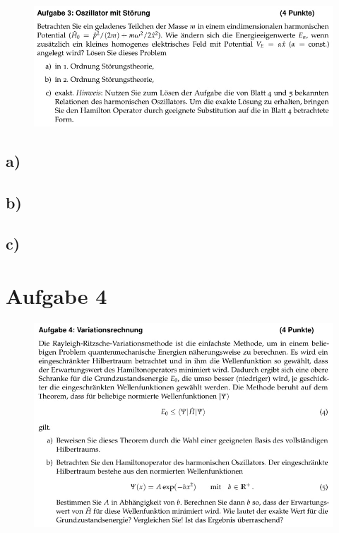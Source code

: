     \begin{figure}[H]
        \centering
        \includegraphics[width=\textwidth]{images/Aufgabe3.jpg}
        \label{fig:4}
    \end{figure}

\subsection{a)}

\subsection{b)}

\subsection{c)}

\section{Aufgabe 4}

    \begin{figure}[H]
        \centering
        \includegraphics[width=\textwidth]{images/Aufgabe4a.jpg}
        \label{fig:5}
    \end{figure}

